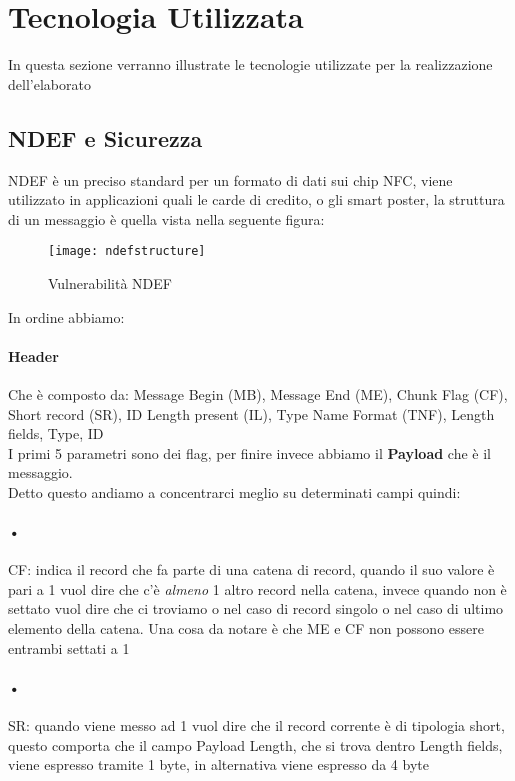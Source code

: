 \section{Tecnologia Utilizzata}
In questa sezione verranno illustrate le tecnologie utilizzate per la realizzazione dell'elaborato
\subsection{NDEF e Sicurezza}
\hspace{\parindent}NDEF è un preciso standard per un formato di dati sui chip NFC, viene utilizzato in applicazioni quali le carde di credito, o gli smart poster, la struttura di un messaggio è quella vista nella seguente figura: 
\begin{figure}[h]
\begin{center}
\texttt{[image: ndefstructure]}
\caption[NDEF Vulnerabilità]{Vulnerabilità NDEF\footnotemark}
\end{center}
\end{figure}
In ordine abbiamo: 
\paragraph{Header}
Che è composto da: Message Begin (MB), Message End (ME), Chunk Flag (CF), Short record (SR), ID Length present (IL), Type Name Format (TNF), Length fields, Type, ID
\\I primi 5 parametri sono dei flag, per finire invece abbiamo il \textbf{Payload} che è il messaggio.
\\Detto questo andiamo a concentrarci meglio su determinati campi quindi:
\paragraph{•}CF: indica il record che fa parte di una catena di record, quando il suo valore è pari a 1 vuol dire che c'è \textit{almeno} 1 altro record nella catena, invece quando non è settato vuol dire che ci troviamo o nel caso di record singolo o nel caso di ultimo elemento della catena. Una cosa da notare è che ME e CF non possono essere entrambi settati a 1
\paragraph{•}SR: quando viene messo ad 1 vuol dire che il record corrente è di tipologia short, questo comporta che il campo Payload Length, che si trova dentro Length fields, viene espresso tramite 1 byte, in alternativa viene espresso da 4 byte
